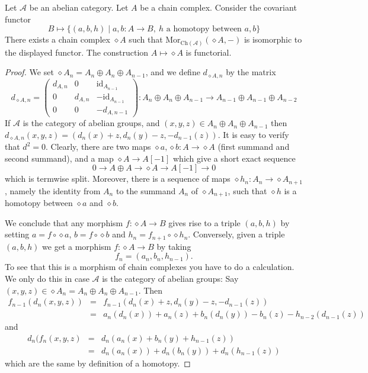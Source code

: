 \begin{lemma}
\label{lemma-represent-homotopy}
Let $\mathcal{A}$ be an abelian category.
Let $A$ be a chain complex.
Consider the covariant functor
$$
B \longmapsto
\{
(a, b, h)
\mid
a, b : A \to B, \ 
h\text{ a homotopy between }a, b
\}
$$
There exists a chain complex $\diamond A$
such that $\text{Mor}_{\text{Ch}(\mathcal{A})}(\diamond A, -)$
is isomorphic to the displayed functor.
The construction $A \mapsto \diamond A$ is functorial.
\end{lemma}

\begin{proof}
We set $\diamond A_n = A_n \oplus A_n \oplus A_{n - 1}$,
and we define $d_{\diamond A, n}$ by the matrix
$$
d_{\diamond A, n}
=
\left(
\begin{matrix}
d_{A, n} & 0 & \text{id}_{A_{n - 1}} \\
0 & d_{A, n} & -\text{id}_{A_{n - 1}} \\
0 & 0 & -d_{A, n - 1}
\end{matrix}
\right) :
A_n \oplus A_n \oplus A_{n - 1} \to
A_{n - 1} \oplus A_{n - 1} \oplus A_{n - 2}
$$
If $\mathcal{A}$ is the category of abelian groups,
and $(x, y, z) \in A_n \oplus A_n \oplus A_{n - 1}$
then $d_{\diamond A, n}(x, y, z) = (d_n(x) + z, d_n(y) - z, -d_{n - 1}(z))$.
It is easy to verify that $d^2 = 0$. Clearly,
there are two maps $\diamond a, \diamond b : A \to \diamond A$
(first summand and second summand),
and a map $\diamond A \to A[-1]$ which give
a short exact sequence
$$
0 \to
A \oplus A \to
\diamond A \to
A[-1] \to
0
$$
which is termwise split. Moreover, there is a sequence
of maps $\diamond h_n : A_n \to \diamond A_{n + 1}$, namely
the identity from $A_n$ to the summand $A_n$ of $\diamond A_{n + 1}$,
such that $\diamond h$ is a homotopy between $\diamond a$ and $\diamond b$.

\medskip\noindent
We conclude that any morphism $f : \diamond A \to B$
gives rise to a triple $(a, b, h)$ by setting $a = f \circ \diamond a$,
$b = f \circ \diamond b$ and $h_n = f_{n + 1} \circ \diamond h_n$.
Conversely, given a triple $(a, b, h)$ we get a morphism
$f : \diamond A \to B$ by taking
$$
f_n = (a_n, b_n, h_{n - 1}).
$$
To see that this is a morphism of chain complexes you have
to do a calculation. We only do this in case $\mathcal{A}$
is the category of abelian groups:
Say $(x, y, z) \in \diamond A_n = A_n \oplus A_n \oplus A_{n - 1}$.
Then
\begin{eqnarray*}
f_{n - 1}(d_n(x, y, z)) & = &
f_{n - 1}(d_n(x) + z, d_n(y) - z, -d_{n - 1}(z)) \\
& = &
a_n(d_n(x)) + a_n(z) + b_n(d_n(y)) - b_n(z) - h_{n - 2}(d_{n - 1}(z))
\end{eqnarray*}
and
\begin{eqnarray*}
d_n(f_n(x, y, z) & = &
d_n(a_n(x) + b_n(y) + h_{n - 1}(z)) \\
& = &
d_n(a_n(x)) + d_n(b_n(y)) + d_n(h_{n - 1}(z))
\end{eqnarray*}
which are the same by definition of a homotopy.
\end{proof}

